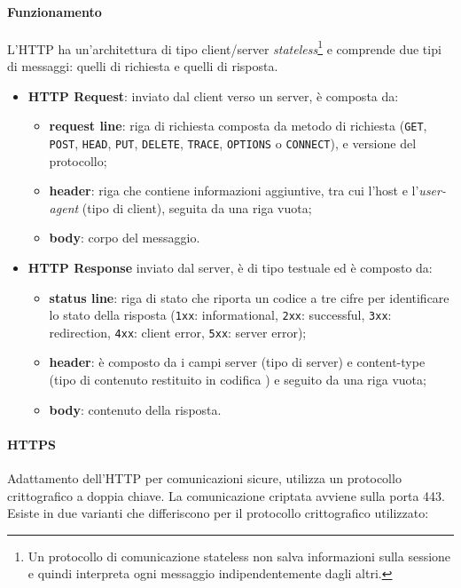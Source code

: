 \documentclass[a4paper,11pt]{article}
\def\code#1{\texttt{#1}}
\def\para#1{\paragraph{#1}\label{#1}}
\def\vedi#1{\nameref{#1}}
\def\italic#1{\textit{#1}}
\begin{document}
\paragraph{Funzionamento} L'HTTP ha un'architettura di tipo client/server \italic{stateless}\footnote{Un protocollo di comunicazione stateless non salva informazioni sulla sessione e quindi interpreta ogni messaggio indipendentemente dagli altri.} e comprende due tipi di messaggi: quelli di richiesta e quelli di risposta.
\begin{itemize}
\item \textbf{HTTP Request}: inviato dal client verso un server, è composta da:
\begin{itemize}
\item \textbf{request line}: riga di richiesta composta da metodo di richiesta (\code{GET}, \code{POST}, \code{HEAD}, \code{PUT}, \code{DELETE}, \code{TRACE}, \code{OPTIONS} o \code{CONNECT}), \vedi{URI} e versione del protocollo;
\item \textbf{header}: riga che contiene informazioni aggiuntive, tra cui l'host e l'\textit{user-agent} (tipo di client), seguita da una riga vuota;
\item \textbf{body}: corpo del messaggio.
\end{itemize}
\item \textbf{HTTP Response} inviato dal server, è di tipo testuale ed è composto da:
\begin{itemize}
\item \textbf{status line}: riga di stato che riporta un codice a tre cifre per identificare lo stato della risposta (\code{1xx}: informational, \code{2xx}: successful, \code{3xx}: redirection, \code{4xx}: client error, \code{5xx}: server error);
\item \textbf{header}: è composto da i campi server (tipo di server) e content-type (tipo di contenuto restituito in codifica \vedi{MIME}) e seguito da una riga vuota;
\item \textbf{body}: contenuto della risposta.
\end{itemize}
\end{itemize}
\para{HTTPS} Adattamento dell'HTTP per comunicazioni sicure, utilizza un protocollo crittografico a doppia chiave. La comunicazione criptata avviene sulla porta 443. Esiste in due varianti che differiscono per il protocollo crittografico  utilizzato:
\end{document}
